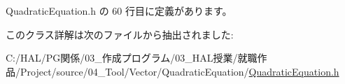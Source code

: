  Quadratic\+Equation.\+h の 60 行目に定義があります。



このクラス詳解は次のファイルから抽出されました\+:\begin{DoxyCompactItemize}
\item 
C\+:/\+H\+A\+L/\+P\+G関係/03\+\_\+作成プログラム/03\+\_\+\+H\+A\+L授業/就職作品/\+Project/source/04\+\_\+\+Tool/\+Vector/\+Quadratic\+Equation/\mbox{\hyperlink{_quadratic_equation_8h}{Quadratic\+Equation.\+h}}\end{DoxyCompactItemize}
